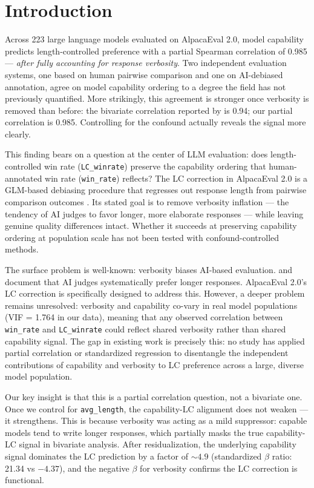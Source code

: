 \section{Introduction}

Across 223 large language models evaluated on AlpacaEval 2.0, model capability predicts
length-controlled preference with a partial Spearman correlation of 0.985 --- \textit{after
fully accounting for response verbosity}. Two independent evaluation systems, one based on
human pairwise comparison and one on AI-debiased annotation, agree on model capability ordering
to a degree the field has not previously quantified. More strikingly, this agreement is stronger
once verbosity is removed than before: the bivariate correlation reported by
\citet{Dubois2024LengthControlled} is 0.94; our partial correlation is 0.985. Controlling for
the confound actually reveals the signal more clearly.

This finding bears on a question at the center of LLM evaluation: does length-controlled win
rate (\texttt{LC\_winrate}) preserve the capability ordering that human-annotated win rate
(\texttt{win\_rate}) reflects? The LC correction in AlpacaEval 2.0 is a GLM-based debiasing
procedure that regresses out response length from pairwise comparison outcomes
\citep{Dubois2024LengthControlled}. Its stated goal is to remove verbosity inflation --- the
tendency of AI judges to favor longer, more elaborate responses --- while leaving genuine
quality differences intact. Whether it succeeds at preserving capability ordering at population
scale has not been tested with confound-controlled methods.

The surface problem is well-known: verbosity biases AI-based evaluation.
\citet{Zheng2023Judging} and \citet{Shi2024Judging} document that AI judges systematically
prefer longer responses. AlpacaEval 2.0's LC correction is specifically designed to address
this. However, a deeper problem remains unresolved: verbosity and capability co-vary in real
model populations (VIF = 1.764 in our data), meaning that any observed correlation between
\texttt{win\_rate} and \texttt{LC\_winrate} could reflect shared verbosity rather than shared
capability signal. The gap in existing work is precisely this: no study has applied partial
correlation or standardized regression to disentangle the independent contributions of
capability and verbosity to LC preference across a large, diverse model population.

Our key insight is that this is a partial correlation question, not a bivariate one. Once we
control for \texttt{avg\_length}, the capability-LC alignment does not weaken --- it
strengthens. This is because verbosity was acting as a mild suppressor: capable models tend to
write longer responses, which partially masks the true capability-LC signal in bivariate
analysis. After residualization, the underlying capability signal dominates the LC prediction
by a factor of ${\sim}4.9$ (standardized $\beta$ ratio: 21.34 vs $-4.37$), and the negative
$\beta$ for verbosity confirms the LC correction is functional.

